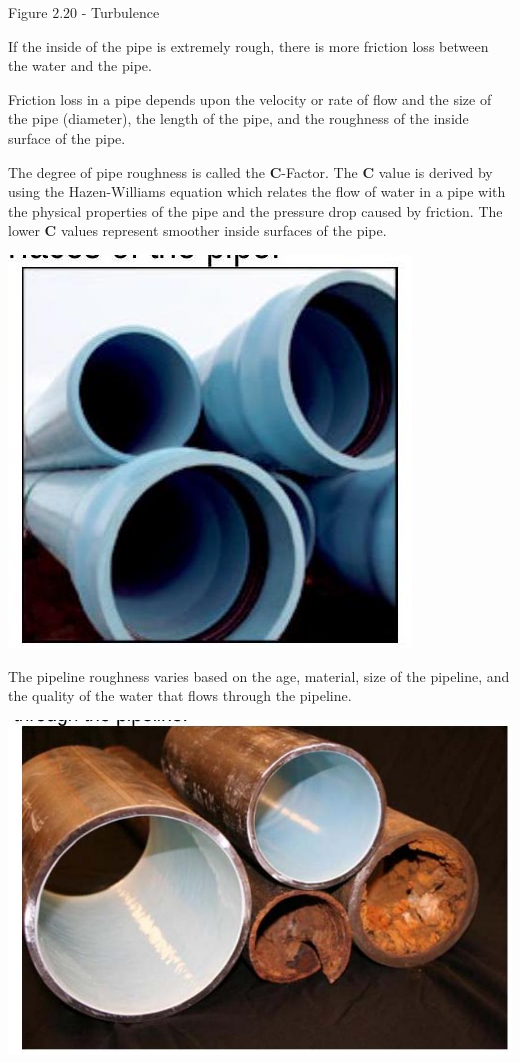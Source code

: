 \documentclass[10pt]{article}
\begin{document}
Figure $2.20$ - Turbulence

If the inside of the pipe is extremely rough, there is more friction loss between the water and the pipe.

Friction loss in a pipe depends upon the velocity or rate of flow and the size of the pipe (diameter), the length of the pipe, and the roughness of the inside surface of the pipe.

The degree of pipe roughness is called the $\boldsymbol{C}$-Factor. The $\boldsymbol{C}$ value is derived by using the Hazen-Williams equation which relates the flow of water in a pipe with the physical properties of the pipe and the pressure drop caused by friction. The lower $\boldsymbol{C}$ values represent smoother inside surfaces of the pipe.

\includegraphics[max width=\textwidth]{2022_10_30_098bb5f44c5986ff92a9g-32}

The pipeline roughness varies based on the age, material, size of the pipeline, and the quality of the water that flows through the pipeline.

\includegraphics[max width=\textwidth]{2022_10_30_098bb5f44c5986ff92a9g-32(1)}
\end{document}
